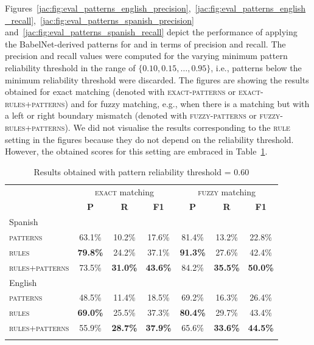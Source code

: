 \documentclass[output=paper]{langsci/langscibook}
\begin{document}
Figures~\ref{jac:fig:eval_patterns_english_precision},~\ref{jac:fig:eval_patterns_english_recall},~\ref{jac:fig:eval_patterns_spanish_precision}
and~\ref{jac:fig:eval_patterns_spanish_recall} depict the performance of applying the BabelNet-derived patterns for  and  
in terms of precision and recall. The precision and recall values were computed for the varying minimum pattern reliability threshold in the range of $\{0.10,0.15,\ldots{},0.95\}$, i.e., patterns below the minimum reliability threshold were discarded.
The figures are showing the results obtained for exact matching (denoted with \textsc{exact}-\textsc{patterns} or \textsc{exact}-\textsc{rules+patterns}) and for fuzzy matching, e.g., when there is a matching but with a left or right boundary mismatch (denoted with \textsc{fuzzy}-\textsc{patterns} or \textsc{fuzzy}-\textsc{rules+patterns}).
We did not visualise the results corresponding to the \textsc{rule} setting in the figures because they do not depend on the reliability threshold. However, the obtained scores for this setting are embraced in Table~\ref{jac:tab:EvalPatterns}.

\begin{table}[h]
\begin{tabular}{l ccc ccc}\lsptoprule
&     \multicolumn{3}{c}{\textsc{exact} matching}  & \multicolumn{3}{c}{\textsc{fuzzy} matching}  \\\cmidrule(lr){2-4}\cmidrule(lr){5-7}
&  \textbf{P}  & \textbf{R}  &  \textbf{F1}  &  \textbf{P}  & \textbf{R}  &  \textbf{F1} \\ 
\midrule
\textnormal{Spanish}                        & & &  & & &   \\
\textsc{patterns}                &     63.1\% & 10.2\% & 17.6\% & 81.4\% & 13.2\% & 22.8\%  \\  
\textsc{rules}   &  \textbf{79.8\%} & 24.2\% & 37.1\% & \textbf{91.3\%} & 27.6\% & 42.4\%  \\
\textsc{rules+patterns}  &     73.5\% & \textbf{31.0\%} & \textbf{43.6\%} & 84.2\% & \textbf{35.5\%} & \textbf{50.0\%}  \\ 
\midrule
\textnormal{English}                        & & & &  & &   \\
\textsc{patterns}                &     48.5\% & 11.4\% & 18.5\% & 69.2\% & 16.3\% & 26.4\%   \\  
\textsc{rules}   &  \textbf{69.0\%} & 25.5\% & 37.3\% & \textbf{80.4\%} & 29.7\% & 43.4\%  \\
\textsc{rules+patterns}  &     55.9\% & \textbf{28.7\%} & \textbf{37.9\%} & 65.6\% & \textbf{33.6\%} & \textbf{44.5\%}  \\ 
\lspbottomrule
\end{tabular}
\caption{Results obtained with pattern reliability threshold = 0.60}
\label{jac:tab:EvalPatterns}
\end{table}
\end{document}
